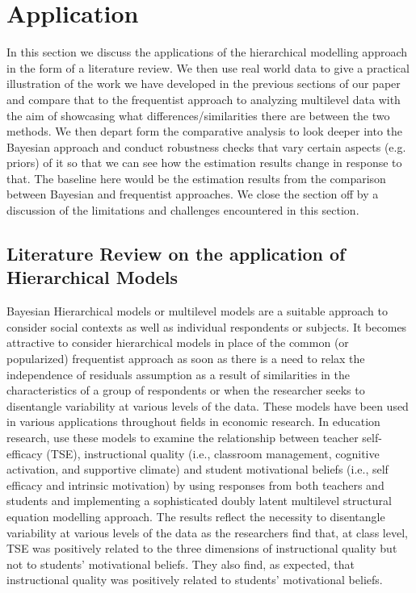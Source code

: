 \section{Application}

In this section we discuss the applications of the hierarchical modelling approach in the form of a literature review. We then use real world data to give a practical illustration of the work we have developed in the previous sections of our paper and compare that to the frequentist approach to analyzing multilevel data with the aim of showcasing what differences/similarities there are between the two methods. We then depart form the comparative analysis to look deeper into the Bayesian approach and conduct robustness checks that vary certain aspects (e.g. priors) of it so that we can see how the estimation results change in response to that. The baseline here would be the estimation results from the comparison between Bayesian and frequentist approaches. We close the section off by a discussion of the limitations and challenges encountered in this section.


\subsection{Literature Review on the application of Hierarchical Models}

Bayesian Hierarchical models or multilevel models are a suitable approach to consider social contexts as well as individual respondents or subjects. It becomes attractive to consider hierarchical models in place of the common (or popularized) frequentist approach as soon as there is a need to relax the independence of residuals assumption as a result of similarities in the characteristics of a group of respondents or when the researcher seeks to disentangle variability at various levels of the data. These models have been used in various applications throughout fields in economic research. In education research, \cite{buric2020teacher} use these models to examine the relationship between teacher self-efficacy (TSE), instructional quality (i.e., classroom management, cognitive activation, and supportive climate) and student motivational beliefs (i.e., self efficacy and intrinsic motivation) by using responses from both teachers and students and implementing a sophisticated doubly latent multilevel structural equation modelling approach. The results reflect the necessity to disentangle variability at various levels of the data as the researchers find that, at class level, TSE was positively related to the three dimensions of instructional quality but not to students' motivational beliefs. They also find, as expected, that instructional quality was positively related to students’ motivational beliefs.

